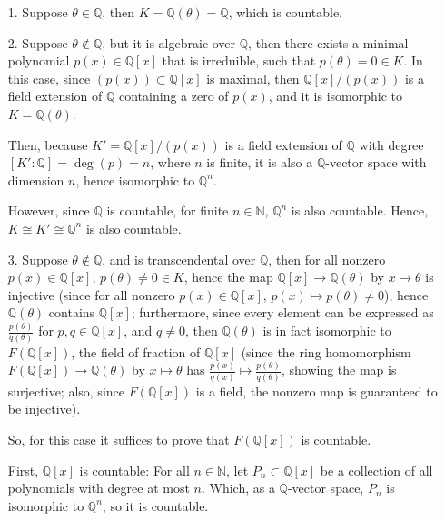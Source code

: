 \documentclass{article}
\begin{document}
\begin{itemize}
    \item[1.] Suppose $\theta\in\mathbb{Q}$, then $K=\mathbb{Q}(\theta)=\mathbb{Q}$, which is countable.

    \item[2.] Suppose $\theta\notin\mathbb{Q}$, but it is algebraic over $\mathbb{Q}$, then there exists a minimal polynomial $p(x)\in\mathbb{Q}[x]$ that is irreduible,
    such that $p(\theta)=0\in K$. In this case, since $(p(x))\subset \mathbb{Q}[x]$ is maximal, then $\mathbb{Q}[x]/(p(x))$ is a field extension of $\mathbb{Q}$ containing a zero of $p(x)$,
    and it is isomorphic to $K=\mathbb{Q}(\theta)$.

    Then, because $K'=\mathbb{Q}[x]/(p(x))$ is a field extension of $\mathbb{Q}$ with degree $[K':\mathbb{Q}]=\deg(p)=n$, where $n$ is finite,
    it is also a $\mathbb{Q}$-vector space with dimension $n$, hence isomorphic to $\mathbb{Q}^n$.

    However, since $\mathbb{Q}$ is countable, for finite $n\in\mathbb{N}$, $\mathbb{Q}^n$ is also countable. Hence, $K\cong K'\cong \mathbb{Q}^n$ is also countable.

    \item[3.] Suppose $\theta\notin \mathbb{Q}$, and is transcendental over $\mathbb{Q}$, then for all nonzero $p(x)\in\mathbb{Q}[x]$, $p(\theta)\neq 0\in K$,
    hence the map $\mathbb{Q}[x]\rightarrow \mathbb{Q}(\theta)$ by $x\mapsto\theta$ is injective (since for all nonzero $p(x)\in\mathbb{Q}[x]$, $p(x)\mapsto p(\theta)\neq 0$),
    hence $\mathbb{Q}(\theta)$ contains $\mathbb{Q}[x]$; furthermore, since every element can be expressed as $\frac{p(\theta)}{q(\theta)}$ for $p,q\in\mathbb{Q}[x]$, and $q\neq 0$,
    then $\mathbb{Q}(\theta)$ is in fact isomorphic to $F(\mathbb{Q}[x])$, the field of fraction of $\mathbb{Q}[x]$ (since the ring homomorphism $F(\mathbb{Q}[x])\rightarrow \mathbb{Q}(\theta)$ by $x\mapsto \theta$ has $\frac{p(x)}{q(x)}\mapsto \frac{p(\theta)}{q(\theta)}$, 
    showing the map is surjective; also, since $F(\mathbb{Q}[x])$ is a field, the nonzero map is guaranteed to be injective).

    So, for this case it suffices to prove that $F(\mathbb{Q}[x])$ is countable.

    \hfil

    First, $\mathbb{Q}[x]$ is countable: For all $n\in\mathbb{N}$, let $P_n\subset \mathbb{Q}[x]$ be a collection of all polynomials with degree at most $n$. 
    Which, as a $\mathbb{Q}$-vector space, $P_n$ is isomorphic to $\mathbb{Q}^n$, so it is countable.


\end{itemize}
\end{document}
